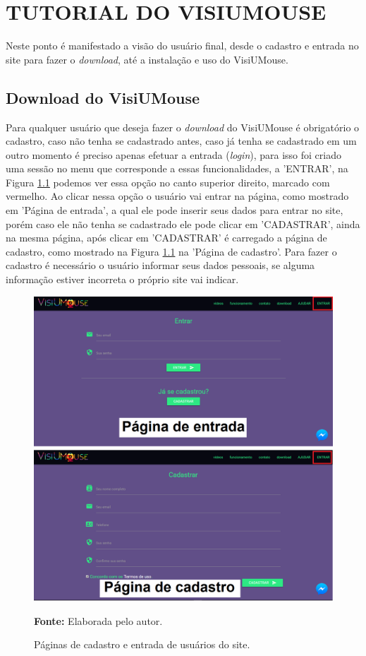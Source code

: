 \chapter{TUTORIAL DO VISIUMOUSE}\label{CAP-tecnologia-visiumouse}
Neste ponto é manifestado a visão do usuário final, desde o cadastro e entrada no site para fazer o \textit{download}, até a instalação e uso do VisiUMouse. 

\section{Download do VisiUMouse}
Para qualquer usuário que deseja fazer o \textit{download} do VisiUMouse é obrigatório o cadastro, caso não tenha se cadastrado antes, caso já tenha se cadastrado em um outro momento é preciso apenas efetuar a entrada (\textit{login}), para isso foi criado uma sessão no menu que corresponde a essas funcionalidades, a 'ENTRAR', na Figura \ref{fig:site-entrar} podemos ver essa opção no canto superior direito, marcado com vermelho. Ao clicar nessa opção o usuário vai entrar na página, como mostrado em 'Página de entrada', a qual ele pode inserir seus dados para entrar no site, porém caso ele não tenha se cadastrado ele pode clicar em 'CADASTRAR', ainda na mesma página, após clicar em 'CADASTRAR' é carregado a página de cadastro, como mostrado na Figura \ref{fig:site-entrar} na 'Página de cadastro'. Para fazer o cadastro é necessário o usuário informar seus dados pessoais, se alguma informação estiver incorreta o próprio site vai indicar. 

\begin{figure}[H]
\caption{Páginas de cadastro e entrada de usuários do site.} 
\centering \includegraphics[scale=0.45]{img/site-entrar.png}

{\fontsize{11}{11}\selectfont \textbf{Fonte:} Elaborada pelo autor.}
\label{fig:site-entrar}
\end{figure}

